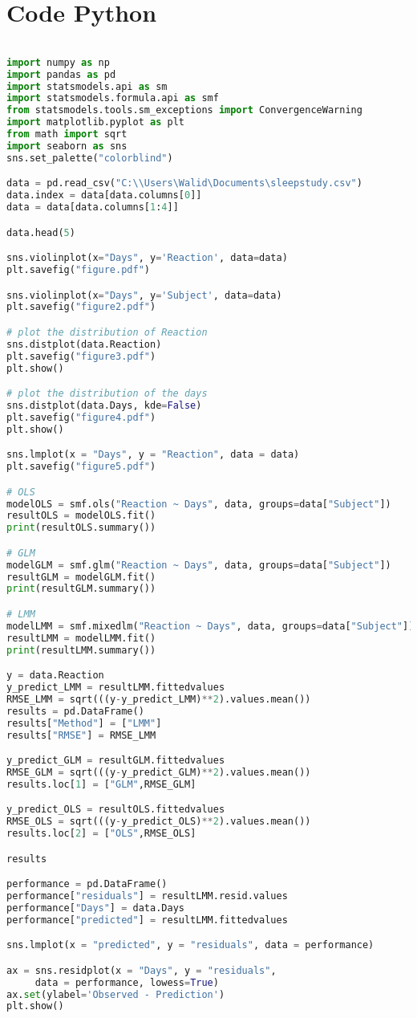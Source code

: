 \section*{Code Python}

\begin{lstlisting}[language=Python]
%matplotlib inline

import numpy as np
import pandas as pd
import statsmodels.api as sm
import statsmodels.formula.api as smf
from statsmodels.tools.sm_exceptions import ConvergenceWarning
import matplotlib.pyplot as plt
from math import sqrt
import seaborn as sns
sns.set_palette("colorblind")

data = pd.read_csv("C:\\Users\Walid\Documents\sleepstudy.csv")
data.index = data[data.columns[0]]
data = data[data.columns[1:4]]

data.head(5)

sns.violinplot(x="Days", y='Reaction', data=data)
plt.savefig("figure.pdf") 

sns.violinplot(x="Days", y='Subject', data=data)
plt.savefig("figure2.pdf") 

# plot the distribution of Reaction
sns.distplot(data.Reaction)
plt.savefig("figure3.pdf")
plt.show()

# plot the distribution of the days
sns.distplot(data.Days, kde=False)
plt.savefig("figure4.pdf") 
plt.show()

sns.lmplot(x = "Days", y = "Reaction", data = data)
plt.savefig("figure5.pdf")

# OLS
modelOLS = smf.ols("Reaction ~ Days", data, groups=data["Subject"])
resultOLS = modelOLS.fit()
print(resultOLS.summary())

# GLM
modelGLM = smf.glm("Reaction ~ Days", data, groups=data["Subject"])
resultGLM = modelGLM.fit()
print(resultGLM.summary())

# LMM
modelLMM = smf.mixedlm("Reaction ~ Days", data, groups=data["Subject"])
resultLMM = modelLMM.fit()
print(resultLMM.summary())

y = data.Reaction
y_predict_LMM = resultLMM.fittedvalues
RMSE_LMM = sqrt(((y-y_predict_LMM)**2).values.mean())
results = pd.DataFrame()
results["Method"] = ["LMM"]
results["RMSE"] = RMSE_LMM

y_predict_GLM = resultGLM.fittedvalues
RMSE_GLM = sqrt(((y-y_predict_GLM)**2).values.mean())
results.loc[1] = ["GLM",RMSE_GLM]

y_predict_OLS = resultOLS.fittedvalues
RMSE_OLS = sqrt(((y-y_predict_OLS)**2).values.mean())
results.loc[2] = ["OLS",RMSE_OLS]

results

performance = pd.DataFrame()
performance["residuals"] = resultLMM.resid.values
performance["Days"] = data.Days
performance["predicted"] = resultLMM.fittedvalues

sns.lmplot(x = "predicted", y = "residuals", data = performance)

ax = sns.residplot(x = "Days", y = "residuals", 
     data = performance, lowess=True)
ax.set(ylabel='Observed - Prediction')
plt.show()


\end{lstlisting}
